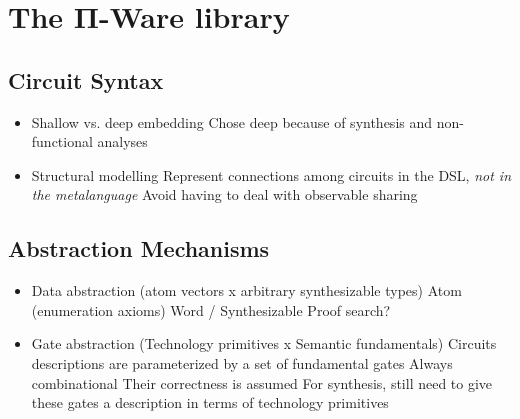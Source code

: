 \chapter{The Π-Ware library}
\label{chap:piware}

    \section{Circuit Syntax}
    \label{sec:circuit-types}
        \begin{itemize}
            \item Shallow vs. deep embedding
                \subitem Chose deep because of synthesis and non-functional analyses
            \item Structural modelling
                \subitem Represent connections among circuits in the DSL, \emph{not in the metalanguage}
                \subitem Avoid having to deal with observable sharing
        \end{itemize}

    \section{Abstraction Mechanisms}
    \label{sec:abstraction}
        \begin{itemize}
            \item Data abstraction (atom vectors x arbitrary synthesizable types)
                \subitem Atom (enumeration axioms)
                \subitem Word / Synthesizable
                    \subsubitem Proof search?
            \item Gate abstraction (Technology primitives x Semantic fundamentals)
                \subitem Circuits descriptions are parameterized by a set of fundamental gates
                    \subsubitem Always combinational
                    \subsubitem Their correctness is assumed
                \subitem For synthesis, still need to give these gates a description in terms of technology primitives
        \end{itemize}

